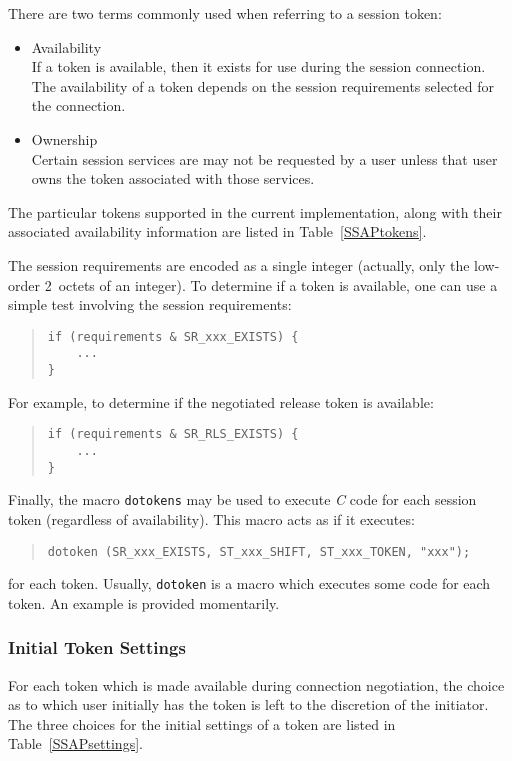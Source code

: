 There are two terms commonly used when referring to a session token:
\begin{itemize}
\item	Availability\\
	If a token is available, then it exists for use during the session
	connection.
	The availability of a token depends on the session requirements
	selected for the connection.
\item	Ownership\\
	Certain session services are may not be requested by a user unless
	that user owns the token associated with those services.
\end{itemize}
The particular tokens supported in the current implementation,
along with their associated availability information are
listed in Table~\ref{SSAPtokens}.

The session requirements are encoded as a single integer
(actually, only the low-order 2~octets of an integer).
To determine if a token is available,
one can use a simple test involving the session requirements:
\begin{quote}\small\begin{verbatim}
if (requirements & SR_xxx_EXISTS) {
    ...
}
\end{verbatim}\end{quote}
For example,
to determine if the negotiated release token is available:
\begin{quote}\small\begin{verbatim}
if (requirements & SR_RLS_EXISTS) {
    ...
}
\end{verbatim}\end{quote}

Finally,
the macro \verb"dotokens" may be used to execute {\em C\/} code for each
session token (regardless of availability).
This macro acts as if it executes:
\begin{quote}\small\begin{verbatim}
dotoken (SR_xxx_EXISTS, ST_xxx_SHIFT, ST_xxx_TOKEN, "xxx");
\end{verbatim}\end{quote}
for each token.
Usually,
\verb"dotoken" is a macro which executes some code for each token.
An example is provided momentarily.

\subsubsection	{Initial Token Settings}
For each token which is made available during connection negotiation,
the choice as to which user initially has the token is left to the discretion
of the initiator.
The three choices for the initial settings of a token are listed in
Table~\ref{SSAPsettings}.

